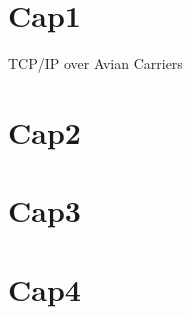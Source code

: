 \documentclass[12pt,a4paper]{report}
\begin{document}

\chapter{Cap1}

TCP/IP over Avian Carriers\cite{waitzman1990standard}

\chapter{Cap2}
\chapter{Cap3}
\chapter{Cap4}




\end{document}
